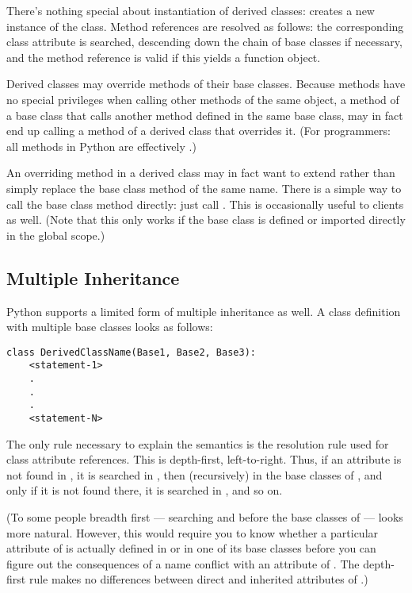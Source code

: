 \documentclass{manual}
\begin{document}
There's nothing special about instantiation of derived classes:
 creates a new instance of the class.  Method
references are resolved as follows: the corresponding class attribute
is searched, descending down the chain of base classes if necessary,
and the method reference is valid if this yields a function object.

Derived classes may override methods of their base classes.  Because
methods have no special privileges when calling other methods of the
same object, a method of a base class that calls another method
defined in the same base class, may in fact end up calling a method of
a derived class that overrides it.  (For \Cpp{} programmers: all methods
in Python are effectively .)

An overriding method in a derived class may in fact want to extend
rather than simply replace the base class method of the same name.
There is a simple way to call the base class method directly: just
call .  This is
occasionally useful to clients as well.  (Note that this only works if
the base class is defined or imported directly in the global scope.)


\subsection{Multiple Inheritance \label{multiple}}

Python supports a limited form of multiple inheritance as well.  A
class definition with multiple base classes looks as follows:

\begin{verbatim}
class DerivedClassName(Base1, Base2, Base3):
    <statement-1>
    .
    .
    .
    <statement-N>
\end{verbatim}

The only rule necessary to explain the semantics is the resolution
rule used for class attribute references.  This is depth-first,
left-to-right.  Thus, if an attribute is not found in
, it is searched in , then
(recursively) in the base classes of , and only if it is
not found there, it is searched in , and so on.

(To some people breadth first --- searching  and
 before the base classes of  --- looks more
natural.  However, this would require you to know whether a particular
attribute of  is actually defined in  or in
one of its base classes before you can figure out the consequences of
a name conflict with an attribute of .  The depth-first
rule makes no differences between direct and inherited attributes of
.)
\end{document}
